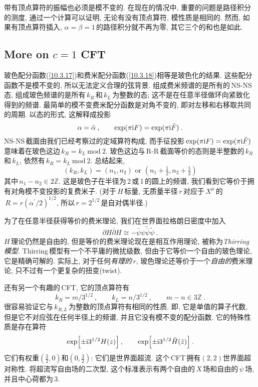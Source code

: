 带有顶点算符的振幅也必须是模不变的. 在现在的情况中, 重要的问题是路径积分的测度, 通过一个计算可以证明, 无论有没有顶点算符, 模性质是相同的. 然而, 如果有顶点算符插入, $\alpha=\beta=1\,$的路径积分就不再为零, 其它三个的和也是如此.



\subsection*{More on $c=1$ CFT}

玻色配分函数(\ref{10.3.17})和费米配分函数(\ref{10.3.18})相等是玻色化的结果. 这些配分函数不是模不变的, 所以无法定义合理的弦背景. 组成费米频谱的是所有的\,NS-NS\,态,  组成玻色频谱的是所有$\,k_{R}\,$和$\,k_{L}\,$为整数的态; 这不是在任意半径做环向紧致化得到的频谱. 最简单的模不变费米配分函数是对角不变的, 即对左移和右移取共同的周期. 以态的形式, 这解释成投影
\begin{equation}
    \alpha=\tilde{\alpha}\:, \qquad \exp(\pi\mathrm{i} F)=\exp(\pi\mathrm{i}\tilde{F})\:.\label{10.7.17}
\end{equation}
NS-NS\,截面由我们已经考察过的定域算符构成, 而手征投影$\,\exp(\pi\mathrm{i} F)=\exp(\pi\mathrm{i}\tilde{F})\,$意味着在玻色这边$\,k_{R}=k_{L}\:\mathrm{mod}\: 2$. 玻色这边与\,R-R\,截面等价的态则是半整数的$\,k_{R}\,$和$\,k_{L}$, 依然有$\,k_{R}=k_{L}\:\mathrm{mod}\: 2$. 总结起来,
\begin{equation}
    (k_{R},k_{L})=(n_{1},n_{2})\text{ or }(n_{1}+\tfrac{1}{2},n_{2}+\tfrac{1}{2}) \label{10.7.18}
\end{equation}
其中$\,n_{1}-n_{2}\in 2\mathds{Z}$. 这是玻色子在半径为\,2\,或\,1\,的圆上的频谱, 我们看到它等价于拥有对角模不变投影的复费米子. (对于\,$H$\,标量, 无质量半径$\,r\,$对应于$\,X^{\mu}\,$的$\,R=r(\alpha^{\prime}/2)^{1/2}$, 所以$\,r=2^{1/2}\,$是自对偶半径.)


为了在任意半径获得等价的费米理论, 我们在世界面拉格朗日密度中加入
\begin{equation}
    \partial H \bar{\partial} H \cong -\overline{\psi}\psi\tilde{\overline{\psi}} \tilde{\psi}\:. \label{10.7.19}
\end{equation}
$H\,$理论仍然是自由的, 但是等价的费米理论现在是相互作用理论, 被称为{\emph{Thirring }\emph{模型}}. Thirring\,模型有一个不平庸的微扰级数, 但由于它等价一个自由的玻色理论, 它是精确可解的. 实际上, 对于任何{\emph{有理的}}$\,r$, 玻色理论还等价于一个{\emph{自由的}}费米理论, 只不过有一个更复杂的扭变(twist).

还有另一个有趣的\,CFT, 它的顶点算符有
\begin{equation}
    k_{R} = m/3^{1/2}\:,\qquad k_{L}=n/3^{1/2} \:,\qquad m-n\in 3\mathds{Z} \:. \label{10.7.20}
\end{equation}
很容易验证它与$\,k_{R,L}\,$为整数的顶点算符有相同的性质. 即, 它是单值的算子代数, 但是它不对应弦在任何半径上的频谱, 并且它没有模不变的配分函数. 它的特殊性质是存在算符
\begin{equation}
    \exp\Bigl[\pm\mathrm{i} 3^{1/2}H(z)\Bigr]\:, \qquad \exp\Bigl[\pm\mathrm{i} 3^{1/2}\tilde{H}(\bar{z})\Bigr]\:.\label{10.7.21}
\end{equation}
它们有权重$(\frac{3}{2},0)$和$(0,\frac{3}{2})$: 它们是世界面超流. 这个\,CFT\,拥有$(2,2)$世界面超对称性. 将超流写自由场的二次型, 这个标准表示有两个自由的$\,X\,$场和自由的$\,\psi\,$场, 并且中心荷都为\,3.

